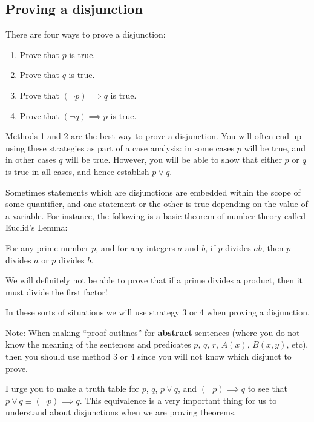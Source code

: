 \newpage

\subsection{Proving a disjunction}

There are four ways to prove a disjunction:
\begin{enumerate}
		\item Prove that $p$ is true.
		\item Prove that $q$ is true.
		\item Prove that $(\neg p) \implies q$ is true.
		\item Prove that $(\neg q) \implies p$ is true. 
	\end{enumerate}

Methods 1 and 2 are the best way to prove a disjunction.  You will often end up using these strategies as part of a case analysis:  in some cases $p$ will be true, and in other cases $q$ will be true.  However, you will be able to show that either $p$ or $q$ is true in all cases, and hence establish $p \vee q$.  

Sometimes statements which are disjunctions are embedded within the scope of some quantifier, and one statement or the other is true depending on the value of a variable.  For instance, the following is a basic theorem of number theory called Euclid's Lemma:



\begin{theorem}
		For any prime number $p$,  and for any integers $a$ and $b$, if $p$ divides $ab$, then $p$ divides $a$ or $p$ divides $b$.
	\end{theorem}

We will definitely not be able to prove that if a prime divides a product, then it must divide the first factor!  

In these sorts of situations we will use strategy 3 or 4 when proving a disjunction.

Note:  When making ``proof outlines'' for \textbf{abstract} sentences (where you do not know the meaning of the sentences and predicates $p$, $q$, $r$, $A(x)$, $B(x,y)$, etc), then you should use method 3 or 4 since you will not know which disjunct to prove.

I urge you to make a truth table for $p$, $q$, $p \vee q$, and $(\neg p) \implies q$ to see that $p \vee q \equiv (\neg p) \implies q$.  This equivalence is a very important thing for us to understand about disjunctions when we are proving theorems.

